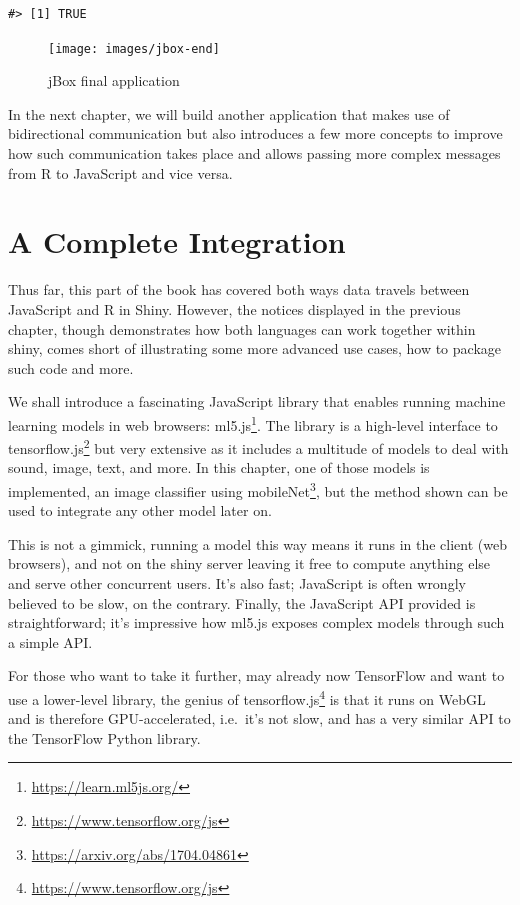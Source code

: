 \documentclass[
  10pt,
]{krantz}
\renewcommand{\href}[2]{#2\footnote{\url{#1}}}
\begin{document}
\begin{verbatim}
#> [1] TRUE
\end{verbatim}

\begin{figure}[H]

{\centering \texttt{[image: images/jbox-end]} 

}

\caption{jBox final application}\label{fig:jbox-end}
\end{figure}

In the next chapter, we will build another application that makes use of bidirectional communication but also introduces a few more concepts to improve how such communication takes place and allows passing more complex messages from R to JavaScript and vice versa.

\hypertarget{shiny-complete}{%
\chapter{A Complete Integration}\label{shiny-complete}}

Thus far, this part of the book has covered both ways data travels between JavaScript and R in Shiny. However, the notices displayed in the previous chapter, though demonstrates how both languages can work together within shiny, comes short of illustrating some more advanced use cases, how to package such code and more.

We shall introduce a fascinating JavaScript library that enables running machine learning models in web browsers: \href{https://learn.ml5js.org/}{ml5.js}. The library is a high-level interface to \href{https://www.tensorflow.org/js}{tensorflow.js} but very extensive as it includes a multitude of models to deal with sound, image, text, and more. In this chapter, one of those models is implemented, an image classifier using \href{https://arxiv.org/abs/1704.04861}{mobileNet}, but the method shown can be used to integrate any other model later on.

This is not a gimmick, running a model this way means it runs in the client (web browsers), and not on the shiny server leaving it free to compute anything else and serve other concurrent users. It's also fast; JavaScript is often wrongly believed to be slow, on the contrary. Finally, the JavaScript API provided is straightforward; it's impressive how ml5.js exposes complex models through such a simple API.

For those who want to take it further, may already now TensorFlow and want to use a lower-level library, the genius of \href{https://www.tensorflow.org/js}{tensorflow.js} is that it runs on WebGL and is therefore GPU-accelerated, i.e.~it's not slow, and has a very similar API to the TensorFlow Python library.
\end{document}
